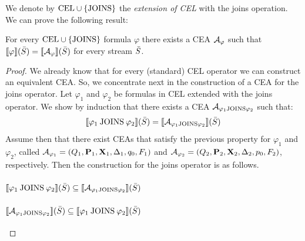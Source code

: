 We denote by $\text{CEL} \cup \{\text{JOINS}\}$ the \emph{extension of CEL} with the joins operation. We can prove the following result:

\begin{theorem} \label{theo:joins}
	For every $\text{CEL} \cup \{\text{JOINS}\}$ formula $\varphi$ there exists a CEA $\mathcal{A}_\varphi$ such that $\sem{\varphi}(\Stream) = \sem{\cA_\varphi}(\Stream)$ for every stream $\bar{S}$.
\end{theorem}

\begin{proof}
	We already know that for every (standard) CEL operator we can construct an equivalent CEA. So, we concentrate next in the construction of a CEA for the joins operator. 
	Let $\varphi_1$ and $\varphi_2$ be formulas in CEL extended with the joins operator. We show by induction that there exists a CEA $\mathcal{A}_{\varphi_1 \mathbin{\text{JOINS}} \varphi_2}$ such that:
	\[
	\sem{\varphi_1 \joins \varphi_2}(\Stream) = \sem{\cAjoins}(\Stream)
	\]
	Assume then that there exist CEAs that satisfy the previous property for $\varphi_1$ and $\varphi_2$, called $\mathcal{A}_{\varphi_1} = (Q_1, \mathbf{P}_1, \mathbf{X}_1, \Delta_1, q_0, F_1)$ and $\mathcal{A}_{\varphi_2} = (Q_2, \mathbf{P}_2, \mathbf{X}_2, \Delta_2, p_0, F_2)$, respectively. 
	Then the construction for the joins operator is as follows. 
	
	\paragraph{$\sem{\varphi_1 \joins \varphi_2}(\Stream) \subseteq \sem{\cAjoins}(\Stream)$}
	\vspace{4cm}
	
	\paragraph{$\sem{\cAjoins}(\Stream) \subseteq \sem{\varphi_1 \joins \varphi_2}(\Stream)$}
	\vspace{4cm}
	
\end{proof}